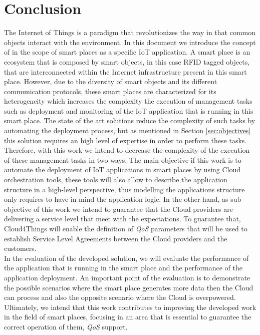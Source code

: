 \section{Conclusion}
\label{sec:conclusion}
The Internet of Things is a paradigm that revolutionizes the way in that common objects
interact with the environment. In this document we introduce the concept of in the scope of smart
places as a specific IoT application. A smart place is an ecosystem that is composed by smart objects,
in this case RFID tagged objects, that are interconnected within the Internet infrastructure present
in this smart place. However, due to the diversity of smart objects and its different communication
protocols, these smart places are characterized for its heterogeneity which increases the
complexity the execution of management tasks such as deployment and monitoring of the
IoT application that is running in this smart place. The state of the art solutions
reduce the complexity of such tasks by automating the deployment process, but as mentioned
in Section \ref{sec:objectives} this solution requires an high level of expertise in
order to perform these tasks.\\

Therefore, with this work we intend to decrease the complexity of the execution of these
management tasks in two ways. The main objective if this work is to automate the deployment
of IoT applications in smart places by using Cloud orchestration tools, these tools will also
allow to describe the application structure in a high-level perspective, thus modelling the applications
structure only requires to have in mind the application logic. In the other hand, as sub
objective of this work we intend to guarantee that the Cloud providers are delivering a service
level that meet with the expectations. To guarantee that, Cloud4Things will enable the
definition of \textit{QoS} parameters that will be used to establish Service Level Agreements
between the Cloud providers and the customers.\\

In the evaluation of the developed solution, we will evaluate the performance of the application
that is running in the smart place and the performance of the application deployment.
An important point of the evaluation is to demonstrate the possible scenarios where the
smart place generates more data then the Cloud can process and also the opposite scenario where
the Cloud is overpowered. Ultimately, we intend that this work contributes to improving the
developed work in the field of smart places, focusing in an area that is essential to guarantee
the correct operation of them, \textit{QoS} support.
